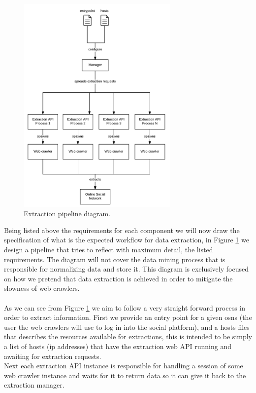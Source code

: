 \begin{figure}[h!]
\begin{center}
  \includegraphics[width=0.7\textwidth]{img/ext-pipeline.png}
\end{center}
\caption{\label{img:extpipeline} Extraction pipeline diagram.}
\end{figure}

Being listed above the requirements for each component we will now draw the specification of what is the expected workflow for data extraction, in Figure \ref{img:extpipeline} we design a pipeline that tries to reflect with maximum detail, the listed requirements. The diagram will not cover the data mining process that is responsible for normalizing data and store it. This diagram is exclusively focused on how we pretend that data extraction is achieved in order to mitigate the slowness of web crawlers.
\\\\
\indent As we can see from Figure \ref{img:extpipeline} we aim to follow a very straight forward process in order to extract information. First we provide an entry point for a given \glspl{osn} (the user the web crawlers will use to log in into the social platform), and a hosts files that describes the resources available for extractions, this is intended to be simply a list of hosts (ip addresses) that have the extraction web API running and awaiting for extraction requests.\\
\indent Next each extraction API instance is responsible for handling a session of some web crawler instance and waits for it to return data so it can give it back to the extraction manager.

